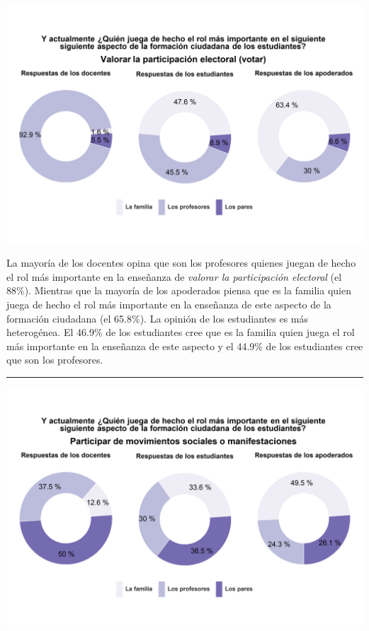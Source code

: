 \documentclass[
  14pt,
]{book}
\let\origfigure\figure
\let\endorigfigure\endfigure
\renewenvironment{figure}[1][2] {
  \expandafter\origfigure\expandafter[H]
} {
  \endorigfigure
}
\begin{document}
\begin{figure}[!ht]

{\centering \includegraphics[width=0.8\linewidth,]{images/graph_for_ciud9} 

}

\caption{Quién juega el rol más importante en valorar la participación electoral}\label{fig:unnamed-chunk-33}
\end{figure}

La mayoría de los docentes opina que son los profesores quienes juegan de hecho el rol más importante en la enseñanza de \emph{valorar la participación electoral} (el 88\%). Mientras que la mayoría de los apoderados piensa que es la familia quien juega de hecho el rol más importante en la enseñanza de este aspecto de la formación ciudadana (el 65.8\%). La opinión de los estudiantes es más heterogénea. El 46.9\% de los estudiantes cree que es la familia quien juega el rol más importante en la enseñanza de este aspecto y el 44.9\% de los estudiantes cree que son los profesores.

\begin{center}\rule{0.5\linewidth}{0.5pt}\end{center}

\begin{figure}[!ht]

{\centering \includegraphics[width=0.8\linewidth,]{images/graph_for_ciud10} 

}

\caption{Quién juega el rol más importante en participar en movimientos sociales}\label{fig:unnamed-chunk-34}
\end{figure}
\end{document}
